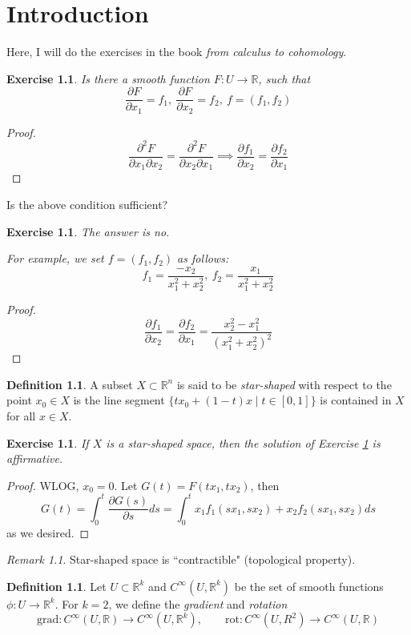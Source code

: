 \documentclass[11pt]{report}
\newtheorem{ex}[thm]{Exercise}
\theoremstyle{definition}
\newtheorem{defn}[thm]{Definition}
\theoremstyle{remark}
\newtheorem{rmk}[thm]{Remark}
\newcommand{\reals}{\mathbb{R}}
\newcommand{\interval}{[0,1]}
\newcommand{\gradient}{\mathrm{grad}}
\newcommand{\rotation}{\mathrm{rot}}
\begin{document}
\chapter{Introduction}\label{start_question}
Here, I will do the exercises in the book \emph{from calculus to  cohomology}.
\begin{ex}
Is there a smooth function $F:U\to\reals$, such that
\[
\frac{\partial F}{\partial x_1}=f_1, ~ \frac{\partial F}{\partial x_2}= f_2, ~ f=(f_1,f_2)
\]
\end{ex}
\begin{proof}
  \[
  \frac{\partial^2F}{\partial x_1\partial x_2}=\frac{\partial^2 F}{\partial x_2\partial x_1}
  \implies \frac{\partial f_1}{\partial x_2}=\frac{\partial f_2}{\partial x_1}
  \]
\end{proof}
Is the above condition sufficient?
\begin{ex}
  The answer is no.
  
  For example, we set $f=(f_1,f_2)$ as follows:
  \[
  f_1=\frac{-x_2}{x_1^2+x_2^2},~ f_2=\frac{x_1}{x_1^2+x_2^2}
  \]
\end{ex}
\begin{proof}
  \[
  \frac{\partial f_1}{\partial x_2}=\frac{\partial f_2}{\partial x_1}=\frac{x_2^2-x_1^2}{(x_1^2+x_2^2)^2}
  \]
\end{proof}
\begin{defn}
  A subset $X\subset\reals^n$ is said to be \emph{star-shaped} with respect to the point $x_0\in X$ is the line segment $\{tx_0+(1-t)x\mid t\in\interval\}$ is contained in $X$ for all $x\in X$.
\end{defn}
\begin{ex}
  If $X$ is a star-shaped space, then the solution of Exercise \ref{start_question} is affirmative.
\end{ex}
\begin{proof}
  WLOG, $x_0=0$. Let $G(t)=F(tx_1,tx_2)$, then
  \[
  G(t)=\int_0^t\frac{\partial G(s)}{\partial s}ds=\int_0^t x_1f_1(sx_1,sx_2)+x_2f_2(sx_1,sx_2) ds
  \]
  as we desired.
\end{proof}
\begin{rmk}
Star-shaped space is ``contractible" (topological property).
\end{rmk}
\begin{defn}
  Let $U\subset\reals^k$ and $C^\infty(U,\reals^k)$ be the set of smooth functions $\phi:U\to \reals^k$. For $k=2$, we define the \emph{gradient} and \emph{rotation}
  \[
  \gradient: C^\infty(U,\reals)\to C^\infty(U,\reals^k),\qquad \rotation:C^\infty(U,R^2)\to C^\infty(U,\reals)
  \]
\end{defn}
\end{document}
